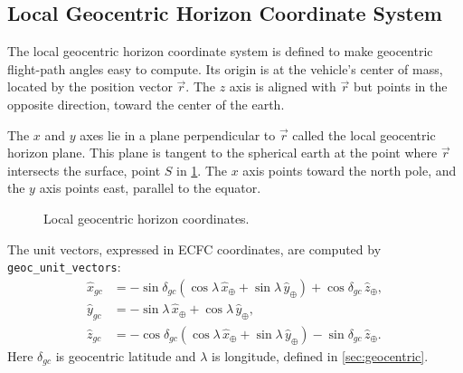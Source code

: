 \subsection{Local Geocentric Horizon Coordinate System}\label{sec:local-geocentric}

The local geocentric horizon coordinate system is defined to make geocentric
flight-path angles easy to compute. Its origin is at the vehicle's center of mass,
located by the position vector $\vec{r}$. The $z$ axis is aligned with $\vec{r}$ but
points in the opposite direction, toward the center of the earth.

The $x$ and $y$ axes lie in a plane perpendicular to $\vec{r}$ called the local
geocentric horizon plane. This plane is tangent to the spherical earth at the point
where $\vec{r}$ intersects the surface, point $S$ in
\cref{fig:local-geocentric-horizon}. The $x$ axis points toward the north pole, and
the $y$ axis points east, parallel to the equator.

\begin{figure}[htbp]
  \centering
  \resizebox{0.66\linewidth}{!}{}
  \caption{Local geocentric horizon coordinates.}
  \label{fig:local-geocentric-horizon}
\end{figure}

The unit vectors, expressed in ECFC coordinates, are computed by
\texttt{geoc\_unit\_vectors}:
\begin{equation}
\begin{aligned}
  \hat{x}_{gc}
    &= -\sin\delta_{gc}
       (\cos\lambda\,\hat{x}_{\oplus}
        +\sin\lambda\,\hat{y}_{\oplus})
       +\cos\delta_{gc}\,\hat{z}_{\oplus},\\
  \hat{y}_{gc}
    &= -\sin\lambda\,\hat{x}_{\oplus}
       +\cos\lambda\,\hat{y}_{\oplus},\\
  \hat{z}_{gc}
    &= -\cos\delta_{gc}
       (\cos\lambda\,\hat{x}_{\oplus}
        +\sin\lambda\,\hat{y}_{\oplus})
       -\sin\delta_{gc}\,\hat{z}_{\oplus}.
\end{aligned}
\label{eq:local-geocentric-unit-vectors}
\end{equation}
Here $\delta_{gc}$ is geocentric latitude and $\lambda$ is longitude, defined in
\cref{sec:geocentric}.
